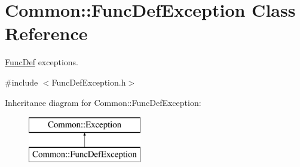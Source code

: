 \hypertarget{class_common_1_1_func_def_exception}{\section{Common\-:\-:Func\-Def\-Exception Class Reference}
\label{class_common_1_1_func_def_exception}
}


\hyperlink{class_common_1_1_func_def}{Func\-Def} exceptions.  




{\ttfamily \#include $<$Func\-Def\-Exception.\-h$>$}

Inheritance diagram for Common\-:\-:Func\-Def\-Exception\-:\begin{figure}[H]
\begin{center}
\leavevmode
\includegraphics[height=2.000000cm]{class_common_1_1_func_def_exception}
\end{center}
\end{figure}
